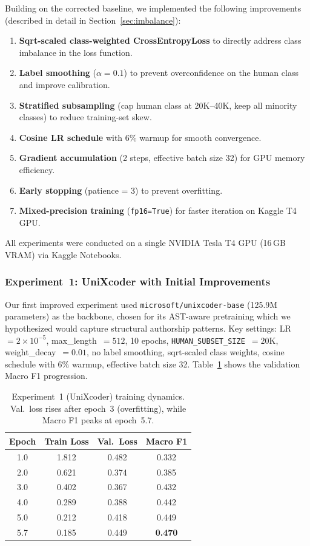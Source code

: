\documentclass[11pt]{article}
\begin{document}
Building on the corrected baseline, we implemented the following improvements (described in detail in Section~\ref{sec:imbalance}):

\begin{enumerate}
    \item \textbf{Sqrt-scaled class-weighted CrossEntropyLoss} to directly address class imbalance in the loss function.
    \item \textbf{Label smoothing} ($\alpha = 0.1$) to prevent overconfidence on the human class and improve calibration.
    \item \textbf{Stratified subsampling} (cap human class at 20K--40K, keep all minority classes) to reduce training-set skew.
    \item \textbf{Cosine LR schedule} with 6\% warmup for smooth convergence.
    \item \textbf{Gradient accumulation} (2 steps, effective batch size 32) for GPU memory efficiency.
    \item \textbf{Early stopping} (patience = 3) to prevent overfitting.
    \item \textbf{Mixed-precision training} (\texttt{fp16=True}) for faster iteration on Kaggle T4 GPU.
\end{enumerate}

All experiments were conducted on a single NVIDIA Tesla T4 GPU (16\,GB VRAM) via Kaggle Notebooks.

\subsubsection{Experiment~1: UniXcoder with Initial Improvements}

Our first improved experiment used \texttt{microsoft/unixcoder-base} (125.9M parameters) as the backbone, chosen for its AST-aware pretraining which we hypothesized would capture structural authorship patterns.
Key settings: LR~$= 2{\times}10^{-5}$, max\_length~$= 512$, 10 epochs, \texttt{HUMAN\_SUBSET\_SIZE}~$= 20\text{K}$, weight\_decay~$= 0.01$, no label smoothing, sqrt-scaled class weights, cosine schedule with 6\% warmup, effective batch size 32.
Table~\ref{tab:taskB_exp1_progress} shows the validation Macro F1 progression.

\begin{table}[htbp]
\centering
\footnotesize
\begin{tabularx}{\columnwidth}{@{}c c c c@{}}
\toprule
\textbf{Epoch} & \textbf{Train Loss} & \textbf{Val.\ Loss} & \textbf{Macro F1} \\ \midrule
1.0 & 1.812 & 0.482 & 0.332 \\
2.0 & 0.621 & 0.374 & 0.385 \\
3.0 & 0.402 & 0.367 & 0.432 \\
4.0 & 0.289 & 0.388 & 0.442 \\
5.0 & 0.212 & 0.418 & 0.449 \\
5.7 & 0.185 & 0.449 & \textbf{0.470} \\
\bottomrule
\end{tabularx}
\caption{Experiment~1 (UniXcoder) training dynamics. Val.\ loss rises after epoch~3 (overfitting), while Macro F1 peaks at epoch~5.7.}
\label{tab:taskB_exp1_progress}
\end{table}
\end{document}
